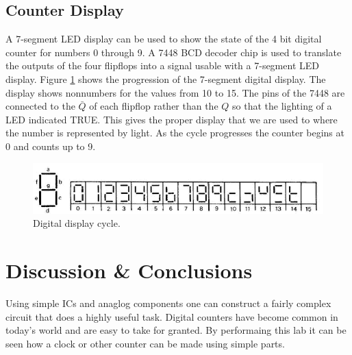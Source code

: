 \documentclass[11pt,onecolumn,letter]{article}
\begin{document}
\subsection{Counter Display}\label{subsec:CounterDisplay}
A 7-segment LED display can be used to show the state of the 4 bit digital counter for numbers 0 through 9. A 7448 BCD decoder chip is used to translate the outputs of the four flipflops into a signal usable with a 7-segment LED display. Figure \ref{fig:display} shows the progression of the 7-segment digital display. The display shows nonnumbers for the values from 10 to 15. The pins of the 7448 are connected to the $\bar{Q}$ of each flipflop rather than the $Q$ so that the lighting of a LED indicated TRUE. This gives the proper display that we are used to where the number is represented by light. As the cycle progresses the counter begins at 0 and counts up to 9.
%
%
\begin{figure}
\center
\includegraphics{display.eps}
\caption{Digital display cycle.}\label{fig:display}
\end{figure}

\section{Discussion \& Conclusions}\label{sec:DiscussionConclusions}
Using simple ICs and anaglog components one can construct a fairly complex circuit that does a highly useful task. Digital counters have become common in today's world and are easy to take for granted. By performaing this lab it can be seen how a clock or other counter can be made using simple parts.
\end{document}
